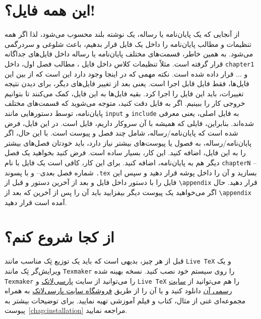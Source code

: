     \section{این همه فایل؟!}\label{sec2}
    از آنجایی که یک پایان‌نامه یا رساله، یک نوشته بلند محسوب می‌شود، لذا اگر همه تنظیمات و مطالب پایان‌نامه را داخل یک فایل قرار بدهیم، باعث شلوغی
    و سردرگمی می‌شود. به همین خاطر، قسمت‌های مختلف پایان‌نامه یا رساله  داخل فایل‌های جداگانه قرار گرفته است. مثلاً تنظیمات  کلاس داخل فایل
    ، 
    مطالب فصل اول، داخل \linebreak
    \Verb!chapter1!
    و ... قرار داده شده است. نکته مهمی که در اینجا وجود دارد این است که از بین این  فایل‌ها، فقط فایل 
    قابل اجرا است. یعنی بعد از تغییر فایل‌های دیگر، برای دیدن نتیجه تغییرات، باید این فایل را اجرا کرد. بقیه فایل‌ها به این فایل، کمک می‌کنند تا بتوانیم خروجی کار را ببینیم. اگر به فایل 
    دقت کنید، متوجه می‌شوید که قسمت‌های مختلف پایان‌نامه، توسط دستورهایی مانند 
    \Verb!input!
    و
    \Verb!include!
    به فایل اصلی، یعنی 
    معرفی شده‌اند. بنابراین، فایلی که همیشه با آن سروکار داریم، فایل 
    است.
    در این فایل، فرض شده است که پایان‌نامه/رساله، شامل چند فصل و پیوست است. با این حال، اگر
      پایان‌نامه/رساله، به فصول یا پیوست‌های بیشتر نیاز دارد، باید خودتان فصل‌های بیشتر را به این فایل، اضافه کنید. این کار، بسیار ساده است. فرض کنید بخواهید یک فصل دیگر هم به پایان‌نامه، اضافه کنید. برای این کار، کافی است یک فایل با نام 
    \Verb!chapterN!  -- شماره فصل بعدی--
    و با پسوند 
    \Verb!.tex!
    بسازید و آن را داخل پوشه 
    قرار دهید و سپس این فایل را با دستور 
    \Verb!!
    داخل فایل
    و بعد از آخرین دستور
    \Verb!!
    و قبل از \Verb+\appendix+ قرار دهید. حال اگر می‌خواهید یک پیوست دیگر بیفزایید باید آن را پس از آخرین \Verb!! 
    که بعد از \Verb+\appendix+ آمده است قرار دهید. 

    \section{از کجا شروع کنم؟}
    قبل از هر چیز، بدیهی است که باید یک توزیع تِک مناسب مانند 
    \Verb!Live TeX!
    و یک ویرایش‌گر تِک مانند
    \Verb!Texmaker!
    را روی سیستم خود نصب کنید.  نسخه بهینه شده \Verb!Texmaker!  را می‌توانید  از سایت 
     \href{http://www.parsilatex.com}{پارسی‌لاتک}%
     و \Verb!Live TeX!  را هم می‌توانید از 
     \href{http://www.tug.org/texlive}{سایت رسمی آن}%
     دانلود کنید و یا آن را از طریق 
     \href{http://parsilatex.com/site/?p=185}{فروشگاه سایت پارسی‌لاتک}%
     به همراه مجموعه‌ای غنی از مثال، کتاب و فیلم آموزشی تهیه نمایید. برای توضیحات بیشتر به پیوست~\ref{chap:installation} مراجعه نمایید. 
     
